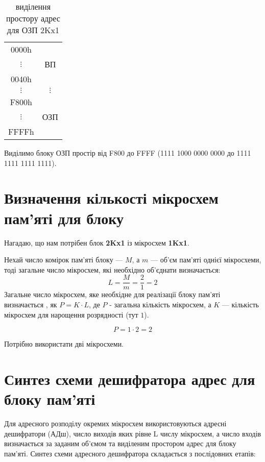 \documentclass[a4paper, 12pt, oneside]{extreport}
\begin{document}
\begin{table}[htbp]
	\begin{center}
		\begin{tabular}{c|c}
			0000h &  \\
			$\vdots$ & ВП \\
			0040h & \\
			$\vdots$ & $\vdots$ \\
			F800h & \\
			$\vdots$ & ОЗП \\
			FFFFh &
		\end{tabular}
		\caption{виділення простору адрес для ОЗП 2Kx1}
	\end{center}
\end{table}

Виділимо блоку ОЗП
		простір від F800 до FFFF
		(1111 1000 0000 0000 до 1111 1111 1111 1111).

\chapter{Визначення кількості мікросхем пам'яті для блоку}

Нагадаю, що нам потрібен блок \textbf{2Kx1} із мікросхем \textbf{1Kx1}.

Нехай число комірок пам’яті блоку --- $M$, а $m$ --- об’єм пам'яті однієї мікросхеми,
тоді загальне число мікросхем, які необхідно об'єднати визначається:
$$
		L=\frac{M}{m}=\frac{2}{1}=2
$$
Загальне число мікросхем, яке необхідне для реалізації блоку пам’яті
визначається , як  $P=K\cdot L$, де $P$ - загальна кількість мікросхем, а $K$ ---
кількість мікросхем для нарощення розрядності (тут $1$).

$$
	P=1\cdot 2 = 2
$$

Потрібно використати дві мікросхеми.

\chapter{Синтез схеми дешифратора адрес для блоку пам'яті}

Для адресного розподілу окремих мікросхем використовуються адресні
дешифратори (АДш), число виходів яких рівне L числу мікросхем, а число
входів визначається за заданим об'ємом та виділеним простором адрес для блоку
пам'яті. Синтез схеми адресного дешифратора складається з послідовних етапів:
\end{document}
